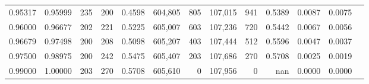 \begin{tabular}{rrrrrrrrrrrrr}
0.95317 & 0.95999 &   235 & 200 &                                     0.4598 & 604,805 &     805 & 107,015 &     941 & 0.5389 & 0.0087 & 0.0075 \\
0.96000 & 0.96677 &   202 & 221 &                                     0.5225 & 605,007 &     603 & 107,236 &     720 & 0.5442 & 0.0067 & 0.0056 \\
0.96679 & 0.97498 &   200 & 208 &                                     0.5098 & 605,207 &     403 & 107,444 &     512 & 0.5596 & 0.0047 & 0.0037 \\
0.97500 & 0.98975 &   200 & 242 &                                     0.5475 & 605,407 &     203 & 107,686 &     270 & 0.5708 & 0.0025 & 0.0019 \\
0.99000 & 1.00000 &   203 & 270 &                                     0.5708 & 605,610 &       0 & 107,956 &       0 &    nan & 0.0000 & 0.0000 \\
\bottomrule
\end{tabular}
